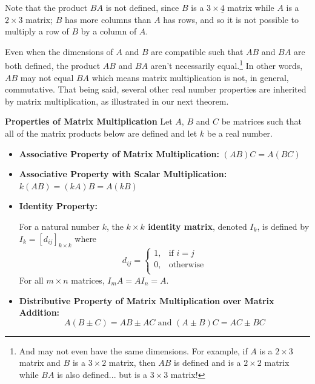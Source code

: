 \documentclass{ximera}
\begin{document}
Note that the product $BA$ is not defined, since $B$ is a $3 \times \underline{4}$ matrix while $A$ is a $\underline{2} \times 3$ matrix;  $B$ has more columns than $A$ has rows, and so it is not possible to multiply a row of $B$ by a column of $A$.  

Even when the dimensions of $A$ and $B$ are compatible such that $AB$ and $BA$ are both defined, the product $AB$ and $BA$ aren't necessarily equal.\footnote{And may not even have the same dimensions.  For example, if $A$ is a $2 \times 3$ matrix and $B$ is a $3 \times 2$ matrix, then $AB$ is defined and is a $2 \times 2$ matrix while $BA$ is also defined... but is a $3 \times 3$ matrix!} In other words, $AB$ may not equal $BA$ which means matrix multiplication is not, in general, commutative.  That being said, several other real number properties are inherited by matrix multiplication, as illustrated in our next theorem.

\smallskip
\begin{theorem}  \label{matrixmultprops}\textbf{Properties of Matrix Multiplication}  Let $A$, $B$ and $C$ be matrices such that all of the matrix products below are defined and let $k$ be a real number.

\begin{itemize}

\item  \textbf{Associative Property of Matrix Multiplication:}  $(AB)C = A(BC)$ 

\item  \textbf{Associative Property with Scalar Multiplication:} $k(AB) = (kA)B = A(kB)$

\item  \textbf{Identity Property:}   

For a natural number $k$, the \textbf{\boldmath $k \times k$ identity matrix}, denoted $I_{k}$, is defined by $I_{k} = \left[d_{ij} \right]_{k \times k}$ where\[ d_{ij} = \left\{ \begin{array}{rl} 1, & \text{if $i=j$} \\ 0, & \text{otherwise} \\ \end{array} \right.\]For all $m \times n$ matrices,  $I_{m}A = AI_{n} = A$. 

\item  \textbf{Distributive Property of Matrix Multiplication over Matrix Addition:}   \[A(B \pm C) = AB \pm AC \mbox{ and } (A \pm B)C = AC \pm BC\]

\end{itemize}

\end{theorem}
\smallskip
\end{document}
